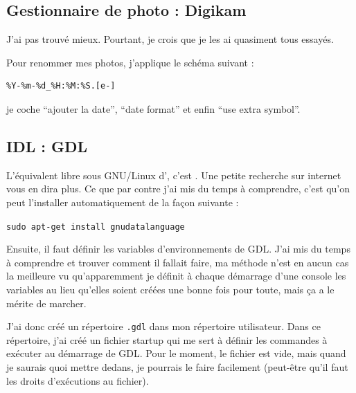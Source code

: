 \documentclass[a4paper,twoside]{article}
\begin{document}

\subsection{Gestionnaire de photo : Digikam}
J'ai pas trouvé mieux. Pourtant, je crois que je les ai quasiment tous essayés.

Pour renommer mes photos, j'applique le schéma suivant :
\begin{verbatim}
%Y-%m-%d_%H:%M:%S.[e-]
\end{verbatim}
je coche ``ajouter la date'', ``date format'' et enfin ``use extra symbol''.


\subsection{IDL : GDL}
L'équivalent libre sous GNU/Linux d', c'est . Une petite recherche sur internet vous en dira plus. Ce que par contre j'ai mis du temps à comprendre, c'est qu'on peut l'installer automatiquement de la façon suivante :

\verb|sudo apt-get install gnudatalanguage|

Ensuite, il faut définir les variables d'environnements de GDL. J'ai mis du temps à comprendre et trouver comment il fallait faire, ma méthode n'est en aucun cas la meilleure vu qu'apparemment je définit à chaque démarrage d'une console les variables au lieu qu'elles soient créées une bonne fois pour toute, mais ça a le mérite de marcher.

J'ai donc créé un répertoire \texttt{.gdl} dans mon répertoire utilisateur. Dans ce répertoire, j'ai créé un fichier startup qui me sert à définir les commandes à exécuter au démarrage de GDL. Pour le moment, le fichier est vide, mais quand je saurais quoi mettre dedans, je pourrais le faire facilement (peut-être qu'il faut les droits d'exécutions au fichier).
\end{document}
